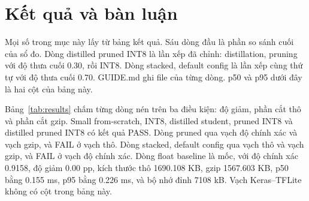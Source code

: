 \documentclass[13pt,a4paper]{article}
\begin{document}
\section{Kết quả và bàn luận}

Mọi số trong mục này lấy từ bảng kết quả.
Sáu dòng đầu là phần so sánh cuối của sổ đo.
Dòng distilled pruned INT8 là lần xếp đã chỉnh: distillation, pruning với độ thưa cuối 0.30, rồi INT8.
Dòng stacked, default config là lần xếp cùng thứ tự với độ thưa cuối 0.70.
GUIDE.md ghi file của từng dòng.
p50 và p95 dưới đây là hai cột của bảng này.

Bảng~\ref{tab:results} chấm từng dòng nén trên ba điều kiện: độ giảm, phần cắt thô và phần cắt gzip.
Small from-scratch, INT8, distilled student, pruned INT8 và distilled pruned INT8 có kết quả PASS.
Dòng pruned qua vạch độ chính xác và vạch gzip, và FAIL ở vạch thô.
Dòng stacked, default config qua vạch thô và vạch gzip, và FAIL ở vạch độ chính xác.
Dòng float baseline là mốc, với độ chính xác 0.9158, độ giảm 0.00 pp, kích thước thô 1690.108 KB, gzip 1567.603 KB, p50 bằng 0.155 ms, p95 bằng 0.226 ms, và bộ nhớ đỉnh 7108 kB.
Vạch Keras–TFLite không có cột trong bảng này.
\end{document}
